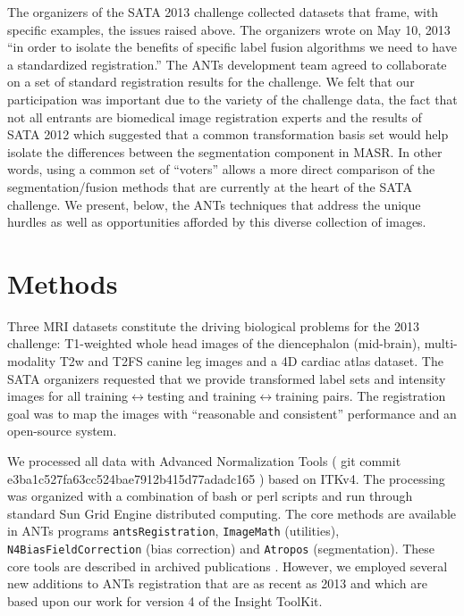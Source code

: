 \documentclass{llncs}
\begin{document}
The organizers of the SATA 2013 challenge collected datasets that
frame, with specific examples, the issues raised above.  The
organizers wrote on May 10, 2013 ``in order to isolate the benefits of
specific label fusion algorithms we need to have a standardized
registration.''  The ANTs development team agreed to collaborate on a set of standard registration results for the challenge.  We
felt that our participation was important due to the variety of the challenge
data, the fact that not all entrants are biomedical image registration
experts and the results of SATA 2012 which suggested that a common
transformation basis set would help isolate the differences between
the segmentation component in MASR.  In other words, using a common
set of ``voters'' allows a more direct comparison of the
segmentation/fusion methods that are currently at the heart of the
SATA challenge. We present,
below, the ANTs techniques that address the unique hurdles as well as
opportunities afforded by this diverse collection of images.

\section{Methods} Three MRI datasets constitute the driving biological
problems for the 2013 challenge: T1-weighted whole head images of the
diencephalon (mid-brain), multi-modality T2w and T2FS canine leg images
and a 4D cardiac atlas dataset.  The SATA organizers requested that we
provide transformed label sets and intensity images for all
training$\leftrightarrow$testing and training$\leftrightarrow$training
pairs.  The registration goal was to map the images with ``reasonable
and consistent'' performance and an open-source system.

We processed all data with Advanced Normalization Tools ( git commit
e3ba1c527fa63cc524bae7912b415d77adadc165 ) based on ITKv4.  The
processing was organized with a combination of bash or perl scripts
and run through standard Sun Grid Engine distributed computing.  The
core methods are available in ANTs programs \texttt{antsRegistration},
\texttt{ImageMath} (utilities), \texttt{N4BiasFieldCorrection} (bias
correction) and \texttt{Atropos} (segmentation).  These core tools are
described in archived publications
\cite{Tustison2010,Avants2011a,Avants2011}.  However, we employed
several new additions to ANTs registration that are as recent as 2013
and which are based upon our work for version 4 of the Insight
ToolKit.
\end{document}
